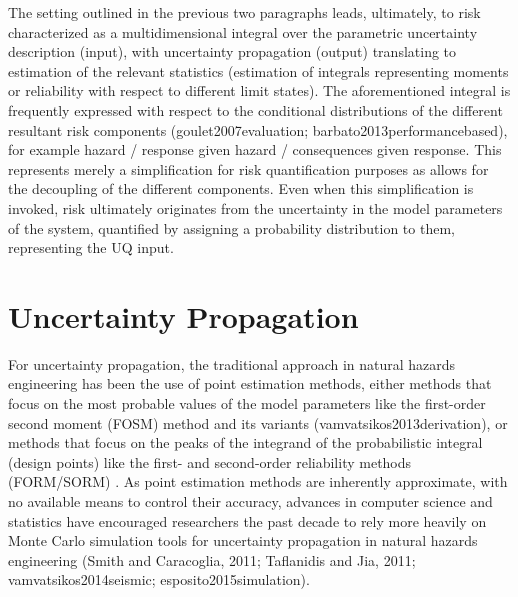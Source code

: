 The setting outlined in the previous two paragraphs leads, ultimately, to risk characterized as a multidimensional integral over the parametric uncertainty description (input), with uncertainty propagation (output) translating to estimation of the relevant statistics (estimation of integrals representing moments or reliability with respect to different limit states). The aforementioned integral is frequently expressed with respect to the conditional distributions of the different resultant risk components (goulet2007evaluation; barbato2013performancebased), for example {hazard / response given hazard / consequences given response}. This represents merely a simplification for risk quantification purposes as allows for the decoupling of the different components. Even when this simplification is invoked, risk ultimately originates from the uncertainty in the model parameters of the system, quantified by assigning a probability distribution to them, representing the UQ input. 

\section{Uncertainty Propagation}
\label{sec:uq_propagation}

For uncertainty propagation, the traditional approach in natural hazards engineering has been the use of point estimation methods, either methods that focus on the most probable values of the model parameters like the first-order second moment (FOSM) method \citep{baker2008uncertainty} and its variants (vamvatsikos2013derivation), or methods that focus on the peaks of the integrand of the probabilistic integral (design points) like the first- and second-order reliability methods (FORM/SORM) \citep{koduru2010feasibility}. As point estimation methods are inherently approximate, with no available means to control their accuracy, advances in computer science and statistics have encouraged researchers the past decade to rely more heavily on Monte Carlo simulation tools for uncertainty propagation in natural hazards engineering (Smith and Caracoglia, 2011; Taflanidis and Jia, 2011; vamvatsikos2014seismic; esposito2015simulation). 

